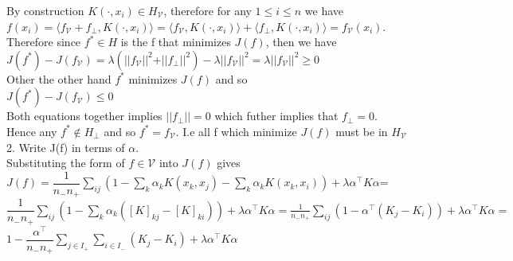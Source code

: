 \documentclass[18pt]{article}
\begin{document}
\begin{flushleft}
\vspace{.4cm}
By construction $K(\cdot,x_i) \in  H_\mathcal{V}$, therefore for any $1 \leq i \leq n$  we have\\
\vspace{.4cm}
\hspace{1cm} $f(x_i)=\langle f_\mathcal{V}+f_\perp,K(\cdot,x_i) \rangle=\langle f_\mathcal{V}, K(\cdot,x_i)\rangle+\langle f_\perp, K(\cdot,x_i)\rangle=f_\mathcal{V}(x_i)$.\\
\vspace{.4cm}
Therefore since $f^* \in H$ is the f that minimizes $J(f)$, then we have\\
\vspace{.4cm}
\hspace{2cm} $J(f^*)-J(f_\mathcal{V})=\lambda(\vert| f_\mathcal{V}\vert|^2+\vert|f_{\perp}\vert|^2)-\lambda\vert| f_\mathcal{V}\vert|^2=\lambda\vert| f_\mathcal{V}\vert|^2 \geq 0$\\
\vspace{.4cm}
Other the other hand $f^*$ minimizes $J(f)$ and so\\
\vspace{.4cm}
\hspace{4cm} $J(f^*)-J(f_\mathcal{V}) \leq 0$\\
\vspace{.4cm}
Both equations together implies $\vert|f_{\perp}\vert|=0$ which futher implies that $f_{\perp}=0$.\\
\vspace{.4cm}
Hence any $f^*\notin H_{\perp}$ and so $f^*=f_\mathcal{V}$. I.e all f which minimize $J(f)$ must be in $H_\mathcal{V}$\\
\vspace{.4cm}
2. Write J(f) in terms of $\alpha$.\\
\vspace{.4cm}
Substituting the form of $f \in \mathcal{V}$ into $J(f)$ gives\\
\vspace{.4cm}
$J(f)=\dfrac{1}{n_-n_+} \sum\limits_{ij} \left(1-\sum\limits_k \alpha_k K(x_k,x_j)-\sum\limits_k \alpha_k K(x_k,x_i)\right)+\lambda\alpha^{\top}K \alpha$=\\
$\dfrac{1}{n_-n_+} \sum\limits_{ij} \left(1-\sum\limits_k \alpha_k([K]_{kj}-[K]_{ki})\right)+\lambda\alpha^{\top}K \alpha=\frac{1}{n_-n_+} \sum\limits_{ij}\left(1-\alpha^{\top}(K_j-K_i)\right)+\lambda\alpha^{\top}K \alpha=$\\
$1- \dfrac{\alpha^{\top}}{ n_{-} n_{+}} \sum\limits_{j \in I_+}\sum\limits_{i \in I_-}\left(K_{j}-K_{i} \right)+\lambda\alpha^{\top}K \alpha$\\

\end{flushleft}
\end{document}
